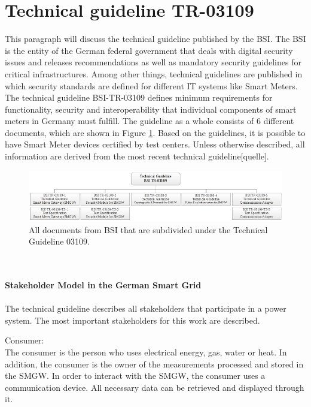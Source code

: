 \section{Technical guideline TR-03109}
This paragraph will discuss the technical guideline published by the BSI. The BSI is the entity of the German federal government that deals with digital security issues and releases recommendations as well as mandatory security guidelines for critical infrastructures. Among other things, technical guidelines are published in which security standards are defined for different IT systems like Smart Meters. The technical guideline BSI-TR-03109 defines minimum requirements for functionality, security and interoperability that individual components of smart meters in Germany must fulfill. The guideline as a whole consists of 6 different documents, which are shown in Figure \ref{fig:TG03109}. Based on the guidelines, it is possible to have Smart Meter devices certified by test centers. Unless otherwise described, all information are derived from the most recent technical guideline[quelle].\begin{figure}[tbp]
  \centering
  \includegraphics[width=1\textwidth]{images/BSI-TR-03109.png}
  \caption[Technical Guideline 03109 Overview]{All documents from BSI that are subdivided under the Technical Guideline 03109.}
  \label{fig:TG03109}
\end{figure}
\\%
\\
\textbf{Stakeholder Model in the German Smart Grid}
\\
\\
The technical guideline describes all stakeholders that participate in a power system. The most important stakeholders for this work are described.
\\\item Consumer: \\
The consumer is the person who uses electrical energy, gas, water
or heat. In addition, the consumer is the owner of the measurements processed and stored in the SMGW. In order to interact with the SMGW, the consumer uses a communication device. All necessary data can be retrieved and displayed through it.\\
